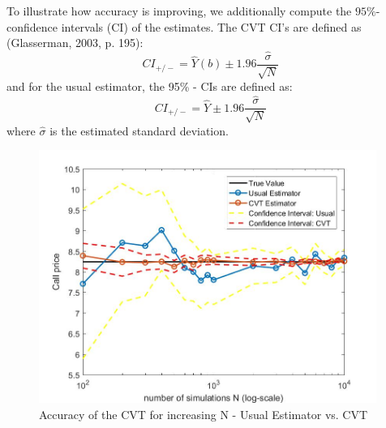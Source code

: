 \documentclass[a4paper,11pt]{article}
\begin{document}
To illustrate how accuracy is improving, we additionally compute the $95\%$-confidence intervals (CI) of the estimates. The CVT CI's are defined as (Glasserman, 2003, p. 195):
\begin{equation}
CI_{+/-} = \hat{Y}(b) \pm 1.96 \dfrac{\hat{\sigma}}{\sqrt{N}}
\end{equation}
and for the usual estimator, the 95\% - CIs are defined as:
\begin{equation}
CI_{+/-} = \hat{Y} \pm 1.96 \dfrac{\hat{\sigma}}{\sqrt{N}}
\end{equation}
where $\hat{\sigma}$ is the estimated standard deviation.
\begin{figure}[!h]
\centering
\includegraphics[width=11cm]{plot21.jpeg}
\caption{Accuracy of the CVT for increasing N - Usual Estimator vs. CVT}
\label{plot21}
\end{figure}
\end{document}
